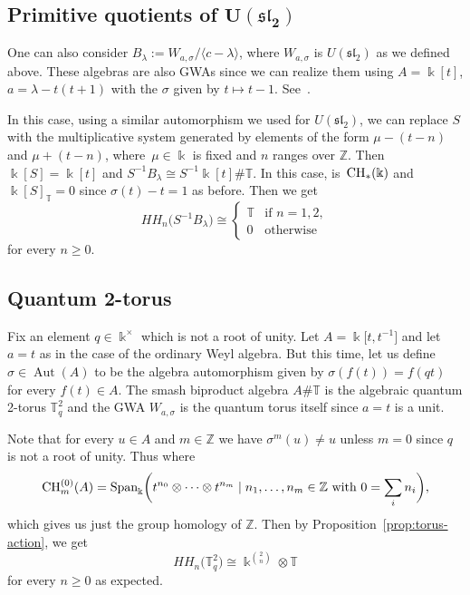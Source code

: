 \documentclass[pdftex]{sigma}
\newcommand{\G}[1]{\mathfrak{#1}}
\newcommand{\B}[1]{\mathbb{#1}}
\newcommand{\CH}{{\rm CH}}
\renewcommand{\geq}{\geqslant}
\numberwithin{equation}{section}
\begin{document}
\subsection[Primitive quotients of U(G sl\_2)]{Primitive quotients of $\boldsymbol{U(\G{sl}_2)}$}

One can also consider $B_\lambda := W_{a,\sigma}/\langle c-\lambda\rangle$, where
$W_{a,\sigma}$ is $U(\G{sl}_2)$ as we defined above. These algebras are also GWAs since we
can realize them using $A=\Bbbk[t]$, $a=\lambda-t(t+1)$ with the $\sigma$ given by
$t\mapsto t-1$. See~\cite[Section 3]{BavulaJordan:IsoProblem}.

In this case, using a similar automorphism we used for $U(\G{sl}_2)$, we can replace $S$ with the
multiplicative system generated by elements of the form $\mu-(t-n)$ and $\mu+(t-n)$, where~${\mu\in\Bbbk}$ is fixed and $n$ ranges over $\B{Z}$. Then $\Bbbk[S] = \Bbbk[t]$ and
$S^{-1}B_\lambda\cong S^{-1}\Bbbk[t]\# \B{T}$. In this case, \smash{$\CH_*\bigl(S^{-1}\Bbbk[t]\bigr)^{\B{T}}$} is~$\CH_*(\Bbbk)$ and $\Bbbk[S]_{\B{T}}=0$ since $\sigma(t)-t=1$ as before. Then we get
\[ HH_n\bigl(S^{-1}B_\lambda\bigr)\cong
 \begin{cases}
 \B{T} & \text{if } n=1,2,\\
 0 & \text{otherwise}
 \end{cases}
\] for every $n\geq 0$.

\subsection{Quantum 2-torus}\label{subsect:quantumTorus}

Fix an element $q\in\Bbbk^\times$ which is not a root of unity. Let $A =\Bbbk\big[t,t^{-1}\big]$ and
let $a=t$ as in the case of the ordinary Weyl algebra. But this time, let us define
$\sigma\in \operatorname{Aut}(A)$ to be the algebra automorphism given by $\sigma(f(t)) = f(qt)$ for every
$f(t)\in A$. The smash biproduct algebra $A\# \B{T}$ is the algebraic quantum 2-torus
$\B{T}^2_q$ and the GWA $W_{a,\sigma}$ is the quantum torus itself since $a=t$ is a unit.

Note that for every $u\in A$ and $m\in\B{Z}$ we have $\sigma^m(u)\neq u$ unless $m=0$
since $q$ is not a root of unity. Thus \smash{$\CH_*(A)_\B{T} = \CH_*(A)^\B{T} = \CH^{(0)}_*(A)$}
where
\[%
 \CH^{(0)}_m(A)
 = \operatorname{Span}_{\Bbbk}\biggl(t^{n_0}\otimes\cdots\otimes t^{n_m}\mid n_1,\ldots,n_m\in\B{Z}
\text{ with } 0 = \sum_i n_i \biggr),
\]
which gives us just the group homology of $\B{Z}$. Then by
Proposition~\ref{prop:torus-action}, we get
\[ HH_n\bigl(\B{T}^2_q\bigr) \cong \Bbbk^{\binom{2}{n}}\otimes \B{T}
\] for every $n\geq 0$ as expected.
\end{document}
